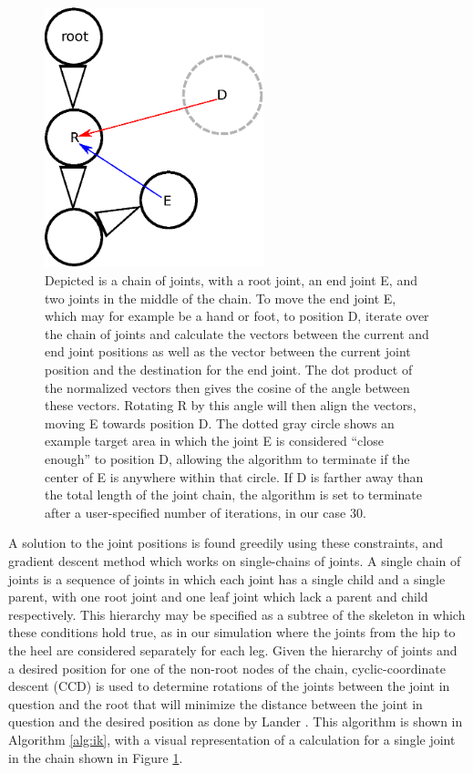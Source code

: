 
\begin{figure}[ht]
	\centering
	\includegraphics[width=2.5in]{images/ik/ccd.eps}
	\caption[Diagram of the process of CCD Inverse Kinematics]{Depicted is a chain of joints, with a root joint, an end joint E, and two joints in the middle of the chain.  To move the end joint E, which may for example be a hand or foot, to position D, iterate over the chain of joints and calculate the vectors between the current and end joint positions as well as the vector between the current joint position and the destination for the end joint.  The dot product of the normalized vectors then gives the cosine of the angle between these vectors.  Rotating R by this angle will then align the vectors, moving E towards position D.  The dotted gray circle shows an example target area in which the joint E is considered ``close enough'' to position D, allowing the algorithm to terminate if the center of E is anywhere within that circle.  If D is farther away than the total length of the joint chain, the algorithm is set to terminate after a user-specified number of iterations, in our case 30.}
	\label{fig:ccd}
\end{figure}

A solution to the joint positions is found greedily using these constraints, and gradient descent method which works on single-chains of joints.  A single chain of joints is a sequence of joints in which each joint has a single child and a single parent, with one root joint and one leaf joint which lack a parent and child respectively.  This hierarchy may be specified as a subtree of the skeleton in which these conditions hold true, as in our simulation where the joints from the hip to the heel are considered separately for each leg.  Given the hierarchy of joints and a desired position for one of the non-root nodes of the chain, cyclic-coordinate descent (CCD) is used to determine rotations of the joints between the joint in question and the root that will minimize the distance between the joint in question and the desired position as done by Lander \cite{kine1, kine2}.  This algorithm is shown in Algorithm \ref{alg:ik}, with a visual representation of a calculation for a single joint in the chain shown in Figure \ref{fig:ccd}.

